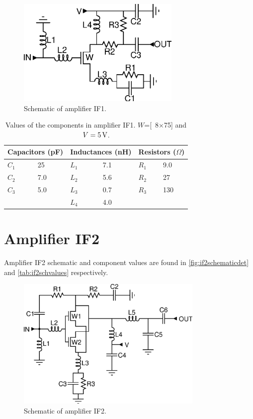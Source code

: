 		\begin{figure}[hbt!]
			\centering
			\includegraphics[width=0.7\textwidth]{fig/schematics/sch_if1_labels}
			\caption[Amplifier IF1 schematic.]{Schematic of amplifier IF1.}\label{fig:if1schematicdet}
		\end{figure}

		\begin{table}[hbt!]
			\caption[Amplifier IF1 component values.]{Values of the components in amplifier IF1. $W$=\unit[8$\times$75]{\mum} and $V=\unit[5]{V}$.}
			\label{tab:if1schvalues}
			\centering
			\begin{tabular}{llllll}
				\multicolumn{2}{l}{Capacitors (pF)} & \multicolumn{2}{l}{Inductances (nH)} & \multicolumn{2}{l}{Resistors ($\Omega$)} \\\hline
				$C_1$ & 25  & $L_1$ & 7.1 & $R_1$ & 9.0 \\
				$C_2$ & 7.0 & $L_2$ & 5.6 & $R_2$ & 27 \\
				$C_3$ & 5.0 & $L_3$ & 0.7 & $R_3$ & 130 \\
					  &     & $L_4$ & 4.0 &  &
			\end{tabular}
		\end{table}

	\newpage
	\section{Amplifier IF2}\label{sec:detif2sch}
		Amplifier IF2 schematic and component values are found in \autoref{fig:if2schematicdet} and \autoref{tab:if2schvalues} respectively.
		\begin{figure}[hbt!]
			\centering
			\includegraphics[width=0.8\textwidth]{fig/schematics/sch_if2_labels}
			\caption[Amplifier IF2 schematic.]{Schematic of amplifier IF2.}\label{fig:if2schematicdet}
		\end{figure}

